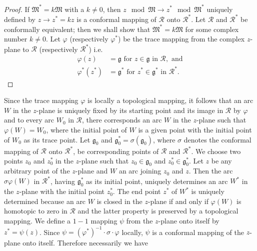 \begin{proof}
If $\mathfrak{M}^{\ast} = k \mathfrak{M}$ with a $k\neq 0$, then $z
\mod \mathfrak{M} \to z^{\ast}\mod \mathfrak{M}^{\ast}$ uniquely
defined by $z\to z^{\ast}=kz$ is a conformal mapping of $\mathscr{R}$
onto $\mathscr{R}^{\ast}$. Let $\mathscr{R}$ and $\mathscr{R}^{\ast}$
be conformally equivalent; then we shall show that
$\mathfrak{M}^{\ast} = k \mathfrak{M}$ for some complex number $k\neq
0$. Let $\varphi$ (respectively $\varphi^{\ast}$) be the trace mapping
from the complex $z$-plane to $\mathscr{R}$ (respectively
$\mathscr{R}^{\ast}$) i.e. 
\begin{align*}
\varphi(z) & = \mathfrak{g} \text{ for } z\in \mathfrak{g}
\text{ in } \mathscr{R}, \text{ and}\\
\varphi^{\ast} (z^{\ast}) & = \mathfrak{g}^{\ast} \text{ for }
z^{\ast} \in \mathfrak{g}^{\ast} \text{ in } \mathscr{R}^{\ast}.
\end{align*}
\end{proof}

Since the trace mapping $\varphi$ is locally a topological mapping,
it follows that an arc $W$ in the $z$-plane is uniquely fixed by its
starting point and its image in $\mathscr{R}$ by $\varphi$ and to
every arc $W_0$ in $\mathscr{R}$, there corresponds an arc $W$ in the
$z$-plane such that $\varphi(W)=W_0$, where the initial point of $W$
is a given point with the initial point of $W_0$ as its trace
point. Let $\mathfrak{g}_0$ and $\mathfrak{g}^{\ast}_0 =
\sigma(\mathfrak{g}_0)$, where $\sigma$ denotes the conformal mapping
of $\mathscr{R}$ onto $\mathscr{R}^{\ast}$, be corresponding points
of $\mathscr{R}$ and $\mathscr{R}^{\ast}$. We choose two points $z_0$
and $z^{\ast}_0$ in the $z$-plane such that $z_0\in
\mathfrak{g}_0$ and $z^{\ast}_0 \in\mathfrak{g}^{\ast}_0$. Let
$z$ be any arbitrary point of the $z$-plane and $W$ an arc joining
$z_0$ and $z$. Then the arc $\sigma \varphi(W)$ in
$\mathscr{R}^{\ast}$, having $\mathfrak{g}^{\ast}_0$ as its initial
point, uniquely determines an arc \pageoriginale $W^{\ast}$ in the
$z$-plane with the initial point $z^{\ast}_0$. The end point
$z^{\ast}$ of $W^{\ast}$ is uniquely determined because an arc $W$ is
closed in the $z$-plane if and only if $\varphi(W)$ is homotopic to
zero in $\mathscr{R}$ and the latter property is preserved by a
topological mapping. We define a $1-1$ mapping $\psi$ from the
$z$-plane onto itself by $z^{\ast}=\psi (z)$. Since
$\psi=(\varphi^{\ast})^{-1}\cdot \sigma\cdot \varphi$ locally, $\psi$
is a conformal mapping of the $z$-plane onto itself. Therefore
necessarily we have


